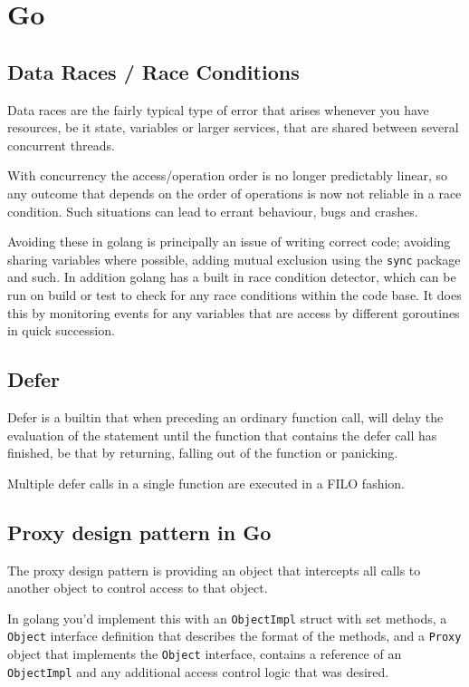 \documentclass[]{article}
\newcommand{\code}{\texttt}
\begin{document}
\large


\section{Go}

    \subsection{Data Races / Race Conditions}
        Data races are the fairly typical type of error that arises whenever you have resources, be it state, variables or larger services, that are shared between several concurrent threads.

        With concurrency the access/operation order is no longer predictably linear, so any outcome that depends on the order of operations is now not reliable in a race condition. Such situations can lead to errant behaviour, bugs and crashes.

        Avoiding these in golang is principally an issue of writing correct code; avoiding sharing variables where possible, adding mutual exclusion using the \code{sync} package and such. In addition golang has a built in race condition detector, which can be run on build or test to check for any race conditions within the code base. It does this by monitoring events for any variables that are access by different goroutines in quick succession.

    \subsection{Defer}
      Defer is a builtin that when preceding an ordinary function call, will delay the evaluation of the statement until the function that contains the defer call has finished, be that by returning, falling out of the function or panicking.

      Multiple defer calls in a single function are executed in a FILO fashion.

    \subsection{Proxy design pattern in Go}

      The proxy design pattern is providing an object that intercepts all calls to another object to control access to that object.

      In golang you'd implement this with an \code{ObjectImpl} struct with set methods, a \code{Object} interface definition that describes the format of the methods, and a \code{Proxy} object that implements the \code{Object} interface, contains a reference of an \code{ObjectImpl} and any additional access control logic that was desired.
\end{document}
